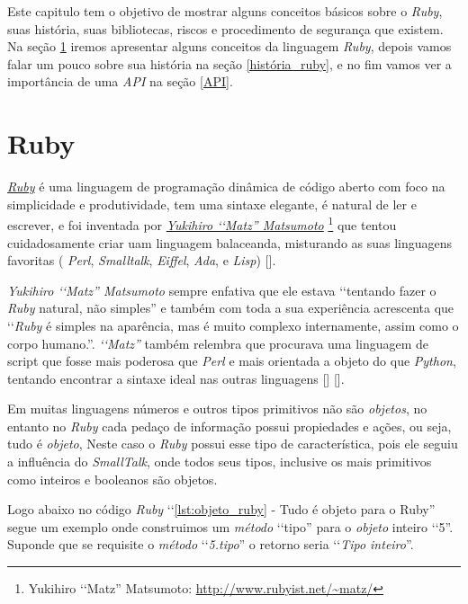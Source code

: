Este capitulo tem o objetivo de mostrar alguns conceitos básicos sobre o \emph{Ruby}, suas
história, suas bibliotecas, riscos e procedimento de segurança que existem.
Na seção \ref{ruby} iremos apresentar alguns conceitos da linguagem \emph{Ruby},
depois vamos falar um pouco sobre sua história na seção \ref{história_ruby}, e no fim vamos ver
a importância de uma \emph{API} na seção \ref{API}.

\section{Ruby}
\label{ruby}

\emph{\href{https://www.ruby-lang.org/en/}{Ruby}} é uma linguagem de programação
dinâmica de código aberto com foco na simplicidade e produtividade, tem uma sintaxe elegante, é natural de
ler e escrever, e foi inventada por \emph{ \href{http://www.rubyist.net/~matz/}{Yukihiro ‘‘Matz'' Matsumoto}}
\footnote{Yukihiro ‘‘Matz'' Matsumoto: \url{http://www.rubyist.net/~matz/}}
que tentou cuidadosamente criar uam linguagem balaceanda, misturando as suas linguagens favoritas
( \emph{Perl}, \emph{Smalltalk}, \emph{Eiffel}, \emph{Ada}, e \emph{Lisp}) [].

\emph{{Yukihiro ‘‘Matz'' Matsumoto}} sempre enfativa que ele estava ‘‘tentando fazer o \emph{Ruby} natural, não simples'' e também com toda a
sua experiência acrescenta que ‘‘\emph{Ruby} é simples na aparência, mas é muito complexo internamente, assim
como o corpo humano.''. \emph{‘‘Matz''} também relembra que procurava uma linguagem de script que fosse mais
poderosa que \emph{Perl} e mais orientada a objeto do que \emph{Python}, tentando encontrar a
sintaxe ideal nas outras linguagens [] [].

Em muitas linguagens números e outros tipos primitivos não são \emph{objetos}, no entanto no \emph{Ruby}
cada pedaço de informação possui propiedades e ações, ou seja, tudo é \emph{objeto}, Neste caso o
\emph{Ruby} possui esse tipo de característica, pois ele seguiu a influência do \emph{SmallTalk}, onde
todos seus tipos, inclusive os mais primitivos como inteiros e booleanos são objetos.

Logo abaixo no código \emph{Ruby} ‘‘\ref{lst:objeto_ruby} - Tudo é objeto para o Ruby'' segue um
exemplo onde construimos um \emph{método} ‘‘tipo'' para o \emph{objeto} inteiro ‘‘5''. Suponde que se
requisite o \emph{método} ‘‘\emph{5.tipo}'' o retorno seria ‘‘\emph{Tipo inteiro}''.

